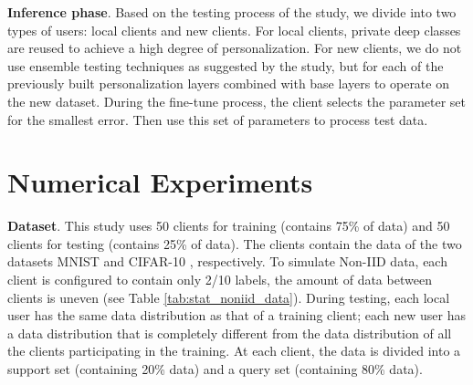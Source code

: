 \documentclass[runningheads]{llncs}
\begin{document}
\textbf{Inference phase}. Based on the testing process of the \cite{liang2020think} study, we divide into two types of users: local clients and new clients. For local clients, private deep classes are reused to achieve a high degree of personalization. For new clients, we do not use ensemble testing techniques as suggested by the \cite{liang2020think} study, but for each of the previously built personalization layers combined with base layers to operate on the new dataset. During the fine-tune process, the client selects the parameter set for the smallest error. Then use this set of parameters to process test data.

\section{Numerical Experiments}

\textbf{Dataset}. This study uses 50 clients for training (contains 75\% of data) and 50 clients for testing (contains 25\% of data). The clients contain the data of the two datasets MNIST \cite{deng2012mnist} and CIFAR-10 \cite{krizhevsky2009learning}, respectively. To simulate Non-IID data, each client is configured to contain only 2/10 labels, the amount of data between clients is uneven (see Table \ref{tab:stat_noniid_data}). During testing, each local user has the same data distribution as that of a training client; each new user has a data distribution that is completely different from the data distribution of all the clients participating in the training. At each client, the data is divided into a support set (containing 20\% data) and a query set (containing 80\% data).

\end{document}
